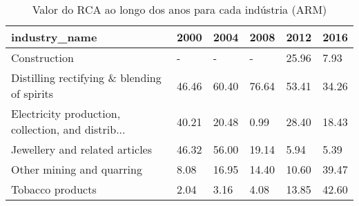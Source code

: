 \begin{table}
\centering
\caption{Valor do RCA ao longo dos anos para cada indústria (ARM)}
\begin{tabular}{p{6cm}p{1.5cm}p{1.5cm}p{1.5cm}p{1.5cm}p{1.5cm}}
\toprule
                                     industry\_name &  2000 &  2004 &  2008 &  2012 &  2016 \\
\midrule
                                      Construction &     - &     - &     - & 25.96 &  7.93 \\
       Distilling rectifying \& blending of spirits & 46.46 & 60.40 & 76.64 & 53.41 & 34.26 \\
Electricity production, collection, and distrib... & 40.21 & 20.48 &  0.99 & 28.40 & 18.43 \\
                    Jewellery and related articles & 46.32 & 56.00 & 19.14 &  5.94 &  5.39 \\
                         Other mining and quarring &  8.08 & 16.95 & 14.40 & 10.60 & 39.47 \\
                                  Tobacco products &  2.04 &  3.16 &  4.08 & 13.85 & 42.60 \\
\bottomrule
\end{tabular}
\end{table}
